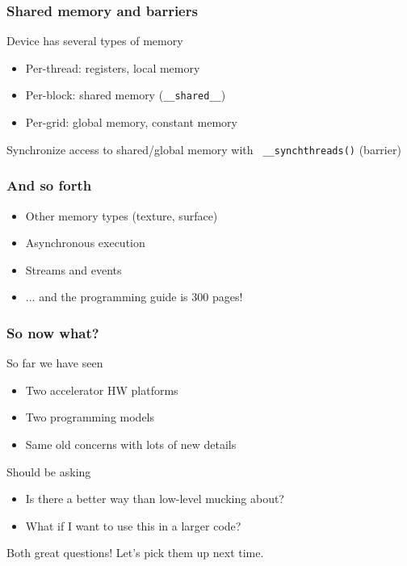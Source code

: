 \documentclass{beamer}
\begin{document}
\begin{frame}
  \frametitle{Shared memory and barriers}
  
  Device has several types of memory
  \begin{itemize}
  \item Per-thread: registers, local memory
  \item Per-block: shared memory ({\tt \_\_shared\_\_})
  \item Per-grid: global memory, constant memory
  \end{itemize}
  Synchronize access to shared/global memory with {\tt
    \_\_synchthreads()} (barrier)
\end{frame}


\begin{frame}
  \frametitle{And so forth}

  \begin{itemize}
  \item Other memory types (texture, surface)
  \item Asynchronous execution
  \item Streams and events
  \item ... and the programming guide is 300 pages!
  \end{itemize}
\end{frame}


\begin{frame}
  \frametitle{So now what?}

  So far we have seen
  \begin{itemize}
  \item Two accelerator HW platforms
  \item Two programming models
  \item Same old concerns with lots of new details
  \end{itemize}
  Should be asking
  \begin{itemize}
  \item Is there a better way than low-level mucking about?
  \item What if I want to use this in a larger code?
  \end{itemize}
  Both great questions!  Let's pick them up next time.
  
\end{frame}

\end{document}
